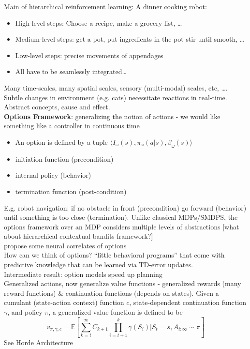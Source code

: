 \documentclass[12pt]{article}
\begin{document}
Main of hierarchical reinforcement learning: A dinner cooking robot:
\begin{itemize}
    \item High-level steps: Choose a recipe, make a grocery list, \ldots
    \item Medium-level steps: get a pot, put ingredients in the pot stir until smooth, \ldots
    \item Low-level steps: precise movements of appendages
    \item All have to be seamlessly integrated\ldots
\end{itemize}
Many time-scales, many spatial scales, sensory (multi-modal) scales, etc, \ldots. Subtle changes in environment (e.g. cats) necessitate reactions in real-time. Abstract concepts, cause and effect. \\

\textbf{Options Framework}\cite{Sutton98}: generalizing the notion of actions - we would like something like a controller in continuous time
\begin{itemize}
    \item An option is defined by a tuple $\langle I_\omega(s), \pi_\omega(a|s), \beta_\omega(s) \rangle$
    \item initiation function (precondition)
    \item internal policy (behavior)
    \item termination function (post-condition)
\end{itemize}
E.g. robot navigation: if no obstacle in front (precondition) go forward (behavior) until something is too close (termination). Unlike classical MDPs/SMDPS, the options framework over an MDP considers multiple levels of abstractions [what about hierarchical contextual bandits framework?] \\

\cite{Botvinick08} propose some neural correlates of options \\

How can we think of options? ``little behavioral programs'' that come with predictive knowledge that can be learned via TD-error updates. \\

Intermediate result: option models speed up planning \\

Generalized actions, now generalize value functions - generalized rewards (many reward functions) \& continuation functions (depends on states). Given a cumulant (state-action context) function $c$, state-dependent continuation function $\gamma$, and policy $\pi$, a generalized value function is defined to be 
$$v_{\pi, \gamma, c} = \mathbb{E}[\sum_{k=t}^\infty C_{k+1}\prod_{i=t+1}^k \gamma(S_i)|S_t = s, A_{t:\infty}\sim \pi]$$
See Horde Architecture \cite{Sutton et al 2011} \\
\end{document}
